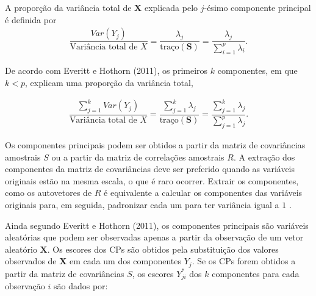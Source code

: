 \documentclass[12pt,a4paper]{article}
\begin{document}
A proporção da variância total de $\boldsymbol{X}$ explicada pelo $j$-ésimo componente principal é definida por
\begin{align*}
	\dfrac{Var(Y_j)}{\textrm{Variância total de } X} = \dfrac{\lambda_j}{\textrm{traço}(\boldsymbol{S})} = \dfrac{\lambda_j}{\displaystyle\sum_{i=1}^{p}\lambda_i}.
\end{align*}
	
	
	
De acordo com Everitt e Hothorn (2011), os primeiros $k$ componentes, em que $k < p$, explicam uma proporção da variância total,
	
\begin{align*}
    \dfrac{\displaystyle\sum_{j=1}^{k}Var(Y_j)}{\textrm{Variância total de } X} = \dfrac{\displaystyle\sum_{j=1}^{k}\lambda_j}{\textrm{traço}(\boldsymbol{S})} = \dfrac{\displaystyle\sum_{j=1}^{k}\lambda_j}{\displaystyle\sum_{j=1}^{p}\lambda_j}.
\end{align*}
	
Os componentes principais podem ser obtidos a partir da matriz de covariâncias amostrais $S$ ou a partir da matriz de correlações amostrais $R$. A extração dos componentes da matriz de covariâncias deve ser preferido quando as variáveis originais estão na mesma escala, o que é raro ocorrer. Extrair os componentes, como os autovetores de $R$ é equivalente a calcular os componentes das variáveis originais para, em seguida, padronizar cada um para ter variância igual a $1$ \cite{everitt11}.
	
Ainda segundo Everitt e Hothorn (2011), os componentes principais são variáveis aleatórias que podem ser observadas apenas a partir da observação de um vetor aleatório $\boldsymbol{X}$. Os escores dos CPs são obtidos pela substituição dos valores observados de $\boldsymbol{X}$ em cada um dos componentes $Y_j$. Se os CPs forem obtidos a partir da matriz de covariâncias $S$, os escores $Y^*_{ji}$ dos $k$ componentes para cada observação $i$ são dados por:  
	
\end{document}
